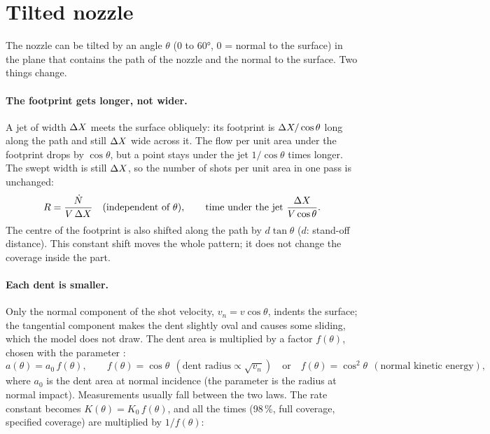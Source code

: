 \section{Tilted nozzle}\label{sec:tilt}

The nozzle can be tilted by an angle $\theta$ (0 to 60°, 0 = normal to the surface) in the plane that contains the path of the nozzle and the normal to the surface. Two things change.

\paragraph{The footprint gets longer, not wider.} A jet of width $\Delta X$ meets the surface obliquely: its footprint is $\Delta X/\cos\theta$ long along the path and still $\Delta X$ wide across it. The flow per unit area under the footprint drops by $\cos\theta$, but a point stays under the jet $1/\cos\theta$ times longer. The swept width is still $\Delta X$, so the number of shots per unit area in one pass is unchanged:
\begin{equation}
R=\frac{\dot N}{V\,\Delta X}\quad\text{(independent of }\theta\text{)},\qquad \text{time under the jet } \frac{\Delta X}{V\cos\theta}.
\end{equation}
The centre of the footprint is also shifted along the path by $d\tan\theta$ ($d$: stand-off distance). This constant shift moves the whole pattern; it does not change the coverage inside the part.

\paragraph{Each dent is smaller.} Only the normal component of the shot velocity, $v_n=v\cos\theta$, indents the surface; the tangential component makes the dent slightly oval and causes some sliding, which the model does not draw. The dent area is multiplied by a factor $f(\theta)$, chosen with the parameter :
\begin{equation}
a(\theta)=a_0\,f(\theta),\qquad f(\theta)=\cos\theta\ \ (\text{dent radius}\propto\sqrt{v_n})\quad\text{or}\quad f(\theta)=\cos^2\theta\ \ (\text{normal kinetic energy}),
\end{equation}
where $a_0$ is the dent area at normal incidence (the parameter  is the radius at normal impact). Measurements usually fall between the two laws. The rate constant becomes $K(\theta)=K_0\,f(\theta)$, and all the times (98\,\%, full coverage, specified coverage) are multiplied by $1/f(\theta)$:


